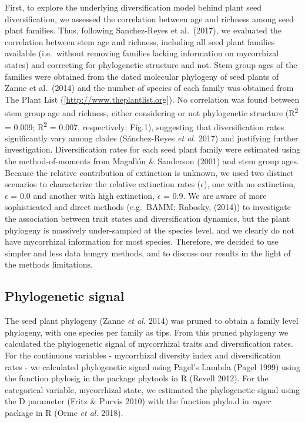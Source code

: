 \documentclass[12pt,]{article}
\begin{document}
First, to explore the underlying diversification model behind plant seed
diversification, we assessed the correlation between age and richness
among seed plant families. Thus, following Sanchez-Reyes et al.~(2017),
we evaluated the correlation between stem age and richness, including
all seed plant families available (i.e.~without removing families
lacking information on mycorrhizal states) and correcting for
phylogenetic structure and not. Stem group ages of the families were
obtained from the dated molecular phylogeny of seed plants of Zanne et
al.~(2014) and the number of species of each family was obtained from
The Plant List ({[}\url{http://www.theplantlist.org}{]}). No correlation
was found between stem group age and richness, either considering or not
phylogenetic structure (R\textsuperscript{2} = 0.009;
R\textsuperscript{2} = 0.007, respectively; Fig.1), suggesting that
diversification rates significantly vary among clades (Sánchez-Reyes
\emph{et al.} 2017) and justifying further investigation.
Diversification rates for each seed plant family were estimated using
the method-of-moments from Magallón \& Sanderson (2001) and stem group
ages. Because the relative contribution of extinction is unknown, we
used two distinct scenarios to characterize the relative extinction
rates (\(\epsilon\)), one with no extinction, \(\epsilon\) = 0.0 and
another with high extinction, \(\epsilon\) = 0.9. We are aware of more
sophisticated and direct methods (e.g.~BAMM; Rabosky, (2014)) to
investigate the association between trait states and diversification
dynamics, but the plant phylogeny is massively under-sampled at the
species level, and we clearly do not have mycorrhizal information for
most species. Therefore, we decided to use simpler and less data hungry
methods, and to discuss our results in the light of the methods
limitations.

\hypertarget{phylogenetic-signal}{%
\subsection{Phylogenetic signal}\label{phylogenetic-signal}}

The seed plant phylogeny (Zanne \emph{et al.} 2014) was pruned to obtain
a family level phylogeny, with one species per family as tips. From this
pruned phylogeny we calculated the phylogenetic signal of mycorrhizal
traits and diversification rates. For the continuous variables -
mycorrhizal diversity index and diversification rates - we calculated
phylogenetic signal using Pagel's Lambda (Pagel 1999) using the function
phylosig in the package phytools in R (Revell 2012). For the categorical
variable, mycorrhizal state, we estimated the phylogenetic signal using
the D parameter (Fritz \& Purvis 2010) with the function phylo.d in
\emph{caper} package in R (Orme \emph{et al.} 2018).
\end{document}
